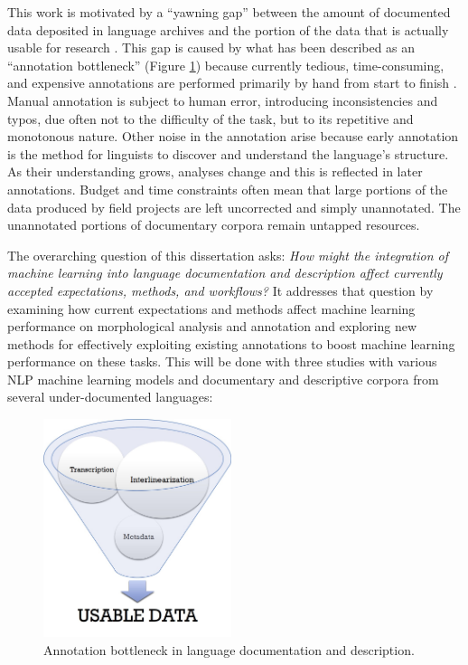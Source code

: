 
This work is motivated by a “yawning gap” between the amount of documented data deposited in language archives and the portion of the data that is actually usable for research \citep{seifart_language_2018}. This gap is caused by what has been described as an ``annotation bottleneck'' (Figure \ref{fig:bottleneck}) because currently tedious, time-consuming, and expensive annotations are performed primarily by hand from start to finish \citep{simons_worlds_2013,holton_developing_2017}. Manual annotation is subject to human error, introducing inconsistencies and typos, due often not to the difficulty of the task, but to its repetitive and monotonous nature. Other noise in the annotation arise because early annotation is the method for linguists to discover and understand the language's structure. As their understanding grows, analyses change and this is reflected in later annotations.
Budget and time constraints often mean that large portions of the data produced by field projects are left uncorrected and simply unannotated. The unannotated portions of documentary corpora remain untapped resources. 

The overarching question of this dissertation asks: \emph{How might the integration of machine learning into language documentation and description affect currently accepted expectations, methods, and workflows?} It addresses that question by examining how current expectations and methods affect machine learning performance on morphological analysis and annotation and exploring new methods for effectively exploiting existing annotations to boost machine learning performance on these tasks. This will be done with three studies with various NLP machine learning models and documentary and descriptive corpora from several under-documented languages:

\begin{figure}[t]
    \centering
    \includegraphics[width=5.5cm]{figs/AnnotationFunnel.jpg}
    \caption[Annotation Bottleneck]{Annotation bottleneck in language documentation and description.}
    \label{fig:bottleneck}
\end{figure}


